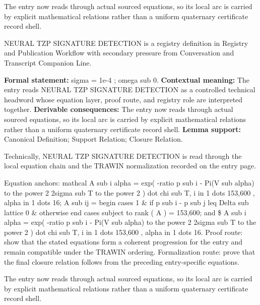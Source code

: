 The entry now reads through actual sourced equations, so its local arc is carried by explicit mathematical relations rather than a uniform quaternary certificate record shell.
\clearpage


\begingroup\small
{}
NEURAL TZP SIGNATURE DETECTION is a registry definition in Registry and Publication Workflow with secondary pressure from Conversation and Transcript Companion Line.

\begingroup\footnotesize\setlength{\emergencystretch}{3em}\sloppy
\textbf{Formal statement:} sigma = 1e-4 ; omega sub 0. \textbf{Contextual meaning:} The entry reads NEURAL TZP SIGNATURE DETECTION as a controlled technical headword whose equation layer, proof route, and registry role are interpreted together. \textbf{Derivable consequences:} The entry now reads through actual sourced equations, so its local arc is carried by explicit mathematical relations rather than a uniform quaternary certificate record shell. \textbf{Lemma support:} Canonical Definition; Support Relation; Closure Relation.\par
\endgroup

Technically, NEURAL TZP SIGNATURE DETECTION is read through the local equation chain and the TRAWIN normalization recorded on the entry page.

Equation anchors: mathcal A sub i alpha = exp( -ratio p sub i - Pi(V sub alpha) to the power 2 2sigma sub T to the power 2 ) dot chi sub T, i in 1 dots 153,600 , alpha in 1 dots 16; A sub ij = begin cases 1 \& if p sub i - p sub j leq Delta sub lattice 0 \& otherwise end cases subject to rank ( A ) = 153,600; and \$ A sub i alpha = exp( -ratio p sub i - Pi(V sub alpha) to the power 2 2sigma sub T to the power 2 ) dot chi sub T, i in 1 dots 153,600 , alpha in 1 dots 16. Proof route: show that the stated equations form a coherent progression for the entry and remain compatible under the TRAWIN ordering. Formalization route: prove that the final closure relation follows from the preceding entry-specific equations.

The entry now reads through actual sourced equations, so its local arc is carried by explicit mathematical relations rather than a uniform quaternary certificate record shell.
\endgroup

